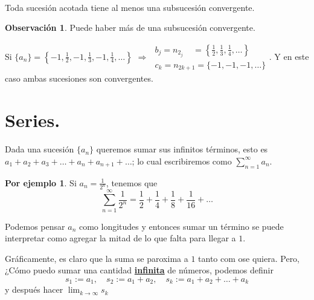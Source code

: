 \documentclass{article}
\theoremstyle{definition}
\theoremstyle{definition}
\newtheorem*{obs}{Observación}
\newtheorem*{ej}{Por ejemplo}
\theoremstyle{remark}
\begin{document}
\begin{teo} \; \\
  Toda sucesión acotada tiene al menos una subsucesión convergente.
\end{teo}
\begin{obs}
  Puede haber más de una subsucesión convergente. 
\end{obs}

Si $\{a_n\} = \left\{ -1,\frac{1}{2},-1,\frac{1}{3},-1,\frac{1}{4},\dots \right\}$
$\Rightarrow$ 
$\begin{array}{l}
  b_j = n_{2_j} \; \; \; \; = \left\{ \frac{1}{2}, \frac{1}{3}, \frac{1}{4}, \dots \right\}\\
  c_k = n_{2k+1} = \{ -1,-1,-1,\dots \}
\end{array}.$
Y en este caso ambas sucesiones son convergentes.

\section{Series.}

Dada una sucesión $\{ a_n \}$ queremos sumar sus infinitos términos, esto es $a_1+a_2+a_3+ \dots + a_n + a_{n+1} + \dots $; lo cual escribiremos como $\sum_{n=1}^{\infty}{a_n} $. \\

\begin{ej}  Si $a_n=\frac{1}{2^n}$, tenemos que  $$\sum_{n=1}^{\infty}{\frac{1}{2^n}}=\frac{1}{2}+\frac{1}{4}+\frac{1}{8}+\frac{1}{16}+\dots$$

\end{ej}

Podemos pensar $a_n$ como longitudes y entonces sumar un término se puede interpretar como agregar la mitad de lo que falta para llegar a $1$.\begin{figure}[h]
\centering
\def\svgwidth{0.75\textwidth}

\end{figure}

Gráficamente, es claro que la suma se paroxima a $1$ tanto com ose quiera. Pero, ¿Cómo puedo sumar una cantidad \textbf{\underline{infinita}} de números, podemos definir \[
  s_1:=a_1, \quad s_2:=a_1+a_2,\quad s_k:= a_1+a_2+\dots + a_k
\]
y después hacer $ \lim_{k \to \infty}{s_k} $
\end{document}
